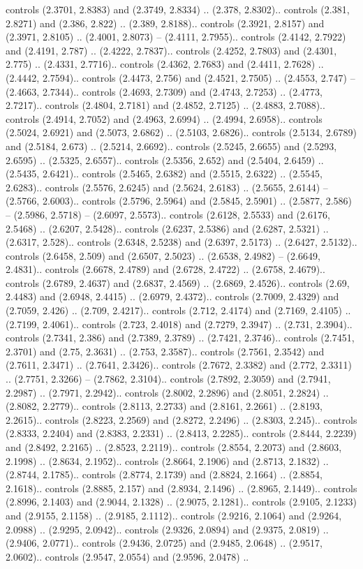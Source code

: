 controls (2.3701, 2.8383) and (2.3749, 2.8334) .. (2.378, 2.8302).. controls (2.381, 2.8271) and (2.386, 2.822) .. (2.389, 2.8188).. controls (2.3921, 2.8157) and (2.3971, 2.8105) .. (2.4001, 2.8073) -- (2.4111, 2.7955).. controls (2.4142, 2.7922) and (2.4191, 2.787) .. (2.4222, 2.7837).. controls (2.4252, 2.7803) and (2.4301, 2.775) .. (2.4331, 2.7716).. controls (2.4362, 2.7683) and (2.4411, 2.7628) .. (2.4442, 2.7594).. controls (2.4473, 2.756) and (2.4521, 2.7505) .. (2.4553, 2.747) -- (2.4663, 2.7344).. controls (2.4693, 2.7309) and (2.4743, 2.7253) .. (2.4773, 2.7217).. controls (2.4804, 2.7181) and (2.4852, 2.7125) .. (2.4883, 2.7088).. controls (2.4914, 2.7052) and (2.4963, 2.6994) .. (2.4994, 2.6958).. controls (2.5024, 2.6921) and (2.5073, 2.6862) .. (2.5103, 2.6826).. controls (2.5134, 2.6789) and (2.5184, 2.673) .. (2.5214, 2.6692).. controls (2.5245, 2.6655) and (2.5293, 2.6595) .. (2.5325, 2.6557).. controls (2.5356, 2.652) and (2.5404, 2.6459) .. (2.5435, 2.6421).. controls (2.5465, 2.6382) and (2.5515, 2.6322) .. (2.5545, 2.6283).. controls (2.5576, 2.6245) and (2.5624, 2.6183) .. (2.5655, 2.6144) -- (2.5766, 2.6003).. controls (2.5796, 2.5964) and (2.5845, 2.5901) .. (2.5877, 2.586) -- (2.5986, 2.5718) -- (2.6097, 2.5573).. controls (2.6128, 2.5533) and (2.6176, 2.5468) .. (2.6207, 2.5428).. controls (2.6237, 2.5386) and (2.6287, 2.5321) .. (2.6317, 2.528).. controls (2.6348, 2.5238) and (2.6397, 2.5173) .. (2.6427, 2.5132).. controls (2.6458, 2.509) and (2.6507, 2.5023) .. (2.6538, 2.4982) -- (2.6649, 2.4831).. controls (2.6678, 2.4789) and (2.6728, 2.4722) .. (2.6758, 2.4679).. controls (2.6789, 2.4637) and (2.6837, 2.4569) .. (2.6869, 2.4526).. controls (2.69, 2.4483) and (2.6948, 2.4415) .. (2.6979, 2.4372).. controls (2.7009, 2.4329) and (2.7059, 2.426) .. (2.709, 2.4217).. controls (2.712, 2.4174) and (2.7169, 2.4105) .. (2.7199, 2.4061).. controls (2.723, 2.4018) and (2.7279, 2.3947) .. (2.731, 2.3904).. controls (2.7341, 2.386) and (2.7389, 2.3789) .. (2.7421, 2.3746).. controls (2.7451, 2.3701) and (2.75, 2.3631) .. (2.753, 2.3587).. controls (2.7561, 2.3542) and (2.7611, 2.3471) .. (2.7641, 2.3426).. controls (2.7672, 2.3382) and (2.772, 2.3311) .. (2.7751, 2.3266) -- (2.7862, 2.3104).. controls (2.7892, 2.3059) and (2.7941, 2.2987) .. (2.7971, 2.2942).. controls (2.8002, 2.2896) and (2.8051, 2.2824) .. (2.8082, 2.2779).. controls (2.8113, 2.2733) and (2.8161, 2.2661) .. (2.8193, 2.2615).. controls (2.8223, 2.2569) and (2.8272, 2.2496) .. (2.8303, 2.245).. controls (2.8333, 2.2404) and (2.8383, 2.2331) .. (2.8413, 2.2285).. controls (2.8444, 2.2239) and (2.8492, 2.2165) .. (2.8523, 2.2119).. controls (2.8554, 2.2073) and (2.8603, 2.1998) .. (2.8634, 2.1952).. controls (2.8664, 2.1906) and (2.8713, 2.1832) .. (2.8744, 2.1785).. controls (2.8774, 2.1739) and (2.8824, 2.1664) .. (2.8854, 2.1618).. controls (2.8885, 2.157) and (2.8934, 2.1496) .. (2.8965, 2.1449).. controls (2.8996, 2.1403) and (2.9044, 2.1328) .. (2.9075, 2.1281).. controls (2.9105, 2.1233) and (2.9155, 2.1158) .. (2.9185, 2.1112).. controls (2.9216, 2.1064) and (2.9264, 2.0988) .. (2.9295, 2.0942).. controls (2.9326, 2.0894) and (2.9375, 2.0819) .. (2.9406, 2.0771).. controls (2.9436, 2.0725) and (2.9485, 2.0648) .. (2.9517, 2.0602).. controls (2.9547, 2.0554) and (2.9596, 2.0478) .. 